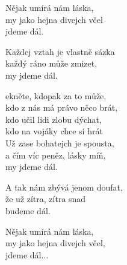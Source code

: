 
\ve
{}Nějak umírá nám láska,\\
my jako hejna divejch včel\\
jdeme dál.

\ve
Každej vztah je vlastně sázka\\
každý ráno může zmizet,\\
my jdeme dál.

\cho{}
ekněte, kdopak za to může,\\
kdo z nás má právo něco brát,\\
kdo učil lidi zlobu dýchat,\\
kdo na vojáky chce si hrát\\

\ve
Už zase bohatejch je spousta,\\
a čím víc peněz, lásky míň,\\
my jdeme dál.

\ve
A tak nám zbývá jenom doufat,\\
že už zítra, zítra snad\\
budeme dál.

\cho{}

\ve
Nějak umírá nám láska,\\
my jako hejna divejch včel,\\
jdeme dál...\\

\esong
